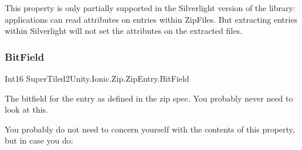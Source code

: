 This property is only partially supported in the Silverlight version of the library\+: applications can read attributes on entries within Zip\+Files. But extracting entries within Silverlight will not set the attributes on the extracted files. \mbox{\label{class_super_tiled2_unity_1_1_ionic_1_1_zip_1_1_zip_entry_abe02c41fe4d270aefd0ae1b271d8bef4}} 
\subsubsection{\texorpdfstring{Bit\+Field}{BitField}}
{\footnotesize\ttfamily Int16 Super\+Tiled2\+Unity.\+Ionic.\+Zip.\+Zip\+Entry.\+Bit\+Field\hspace{0.3cm}{\ttfamily [get]}}



The bitfield for the entry as defined in the zip spec. You probably never need to look at this. 

You probably do not need to concern yourself with the contents of this property, but in case you do\+: 

